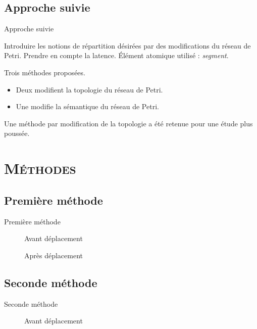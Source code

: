 \subsection{Approche suivie}
\begin{frame}{Approche suivie}
	\begin{itemize}
		\itemar Introduire les notions de répartition désirées par des modifications du réseau de Petri.
		\itemar Prendre en compte la latence.
		\itemar Élément atomique utilisé : \textit{segment}.
	\end{itemize}
	\vspace{1em}
	Trois méthodes proposées.
	\begin{itemize}
		\item Deux modifient la topologie du réseau de Petri.
		\item Une modifie la sémantique du réseau de Petri.
	\end{itemize}
	
	Une méthode par modification de la topologie a été retenue pour une étude plus poussée.
\end{frame}

\section{\scshape Méthodes}
\subsection{Première méthode}
\begin{frame}{Première méthode}
	\begin{figure}[h!]
		\centering
		\resizebox{!}{2cm}{}
		\caption{Avant déplacement}
		\label{fig:deplacementMethode1}
	\end{figure}
	\begin{figure}[h!]
		\centering
		\resizebox{!}{3cm}{}
		\caption{Après déplacement}
		\label{fig:deplacementMethode1-2}
	\end{figure}
\end{frame}

\subsection{Seconde méthode}
\begin{frame}{Seconde méthode}
	\begin{figure}[h!]
		\centering
		
		\caption{Avant déplacement}
		\label{fig:deplacementMethode2}
	\end{figure}
\end{frame}

